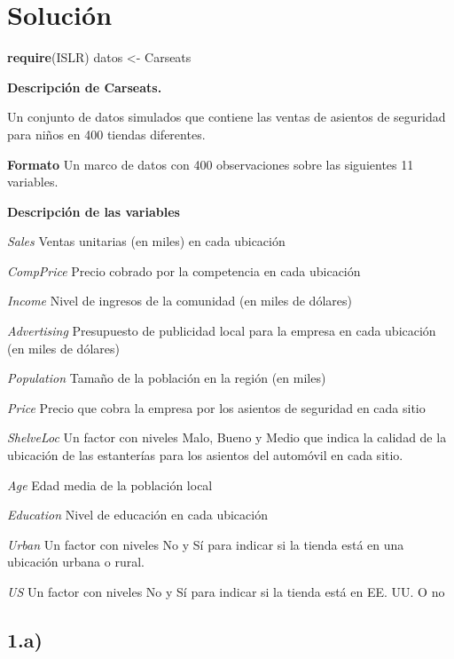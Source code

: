 \documentclass[
]{article}
\newenvironment{Shaded}{\begin{snugshade}}{\end{snugshade}}
\newcommand{\KeywordTok}[1]{\textcolor[rgb]{0.13,0.29,0.53}{\textbf{#1}}}
\newcommand{\NormalTok}[1]{#1}
\newcommand{\StringTok}[1]{\textcolor[rgb]{0.31,0.60,0.02}{#1}}
\begin{document}
\hypertarget{soluciuxf3n}{%
\section{Solución}\label{soluciuxf3n}}

\begin{Shaded}
\begin{Highlighting}[]
\KeywordTok{require}\NormalTok{(ISLR)}
\NormalTok{datos <-}\StringTok{ }\NormalTok{Carseats}
\end{Highlighting}
\end{Shaded}

\textbf{Descripción de Carseats.}

Un conjunto de datos simulados que contiene las ventas de asientos de
seguridad para niños en 400 tiendas diferentes.

\textbf{Formato} Un marco de datos con 400 observaciones sobre las
siguientes 11 variables.

\textbf{Descripción de las variables}

\emph{Sales} Ventas unitarias (en miles) en cada ubicación

\emph{CompPrice} Precio cobrado por la competencia en cada ubicación

\emph{Income} Nivel de ingresos de la comunidad (en miles de dólares)

\emph{Advertising} Presupuesto de publicidad local para la empresa en
cada ubicación (en miles de dólares)

\emph{Population} Tamaño de la población en la región (en miles)

\emph{Price} Precio que cobra la empresa por los asientos de seguridad
en cada sitio

\emph{ShelveLoc} Un factor con niveles Malo, Bueno y Medio que indica la
calidad de la ubicación de las estanterías para los asientos del
automóvil en cada sitio.

\emph{Age} Edad media de la población local

\emph{Education} Nivel de educación en cada ubicación

\emph{Urban} Un factor con niveles No y Sí para indicar si la tienda
está en una ubicación urbana o rural.

\emph{US} Un factor con niveles No y Sí para indicar si la tienda está
en EE. UU. O no

\hypertarget{a}{%
\subsection{1.a)}\label{a}}
\end{document}
